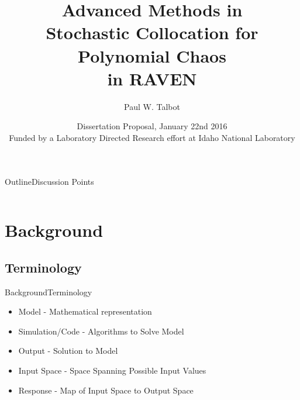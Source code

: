 \documentclass{beamer}
\title[UQ in RAVEN] %
{Advanced Methods in \\Stochastic Collocation for Polynomial Chaos\\in RAVEN}
\author[Talbot] %
{Paul W. Talbot}%
\institute[University of New Mexico] %
{
  University of New Mexico%
}
\date[Jan 22 2016] %
{Dissertation Proposal, January 22nd 2016\\\vspace{10pt}\small Funded by a Laboratory Directed Research effort at Idaho National Laboratory}
\begin{document}
\AtBeginSection[]{\begin{frame}{Outline}\vspace{-20pt}
  \tableofcontents[currentsection,hideothersubsections]%
\end{frame}}

\begin{frame}
  \titlepage
\end{frame}


\begin{frame}{Outline}{Discussion Points}
  \begin{columns}
  \begin{column}{0.1\textwidth}
  \end{column}
  \begin{column}{0.9\textwidth}
    \setcounter{tocdepth}{2}
    \tableofcontents[]
  \end{column}
  \end{columns}
\end{frame}

\section{Background}

\subsection{Terminology}
\begin{frame}{Background}{Terminology}\vspace{-20pt}
  \begin{itemize}
  \item Model - Mathematical representation
  \item Simulation/Code - Algorithms to Solve Model
  \item Output - Solution to Model \vspace{20pt}
  \item Input Space - Space Spanning Possible Input Values
  \item Response - Map of Input Space to Output Space
  \end{itemize}
\end{frame}
\end{document}
